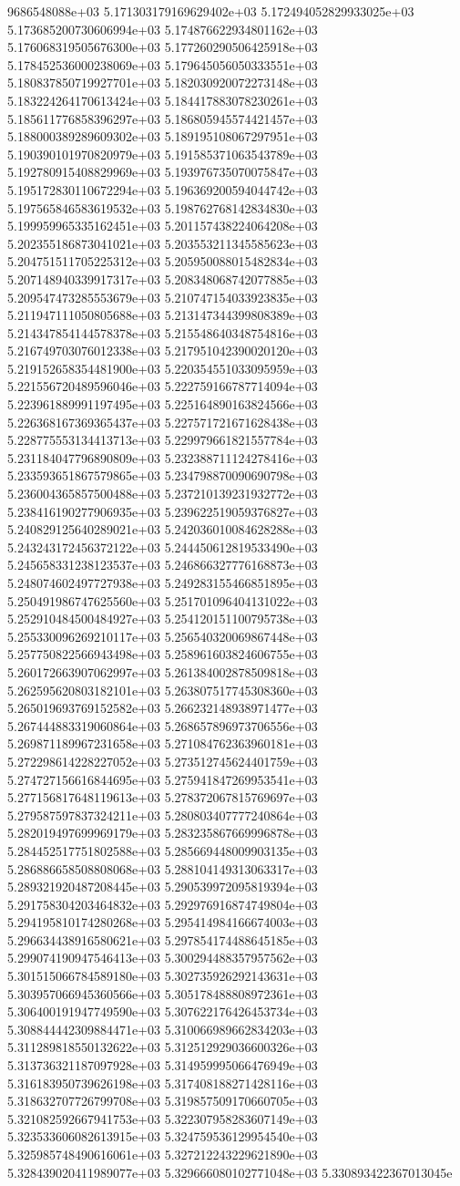 9686548088e+03	5.171303179169629402e+03	5.172494052829933025e+03	5.173685200730606994e+03	5.174876622934801162e+03	5.176068319505676300e+03	5.177260290506425918e+03	5.178452536000238069e+03	5.179645056050333551e+03	5.180837850719927701e+03	5.182030920072273148e+03	5.183224264170613424e+03	5.184417883078230261e+03	5.185611776858396297e+03	5.186805945574421457e+03	5.188000389289609302e+03	5.189195108067297951e+03	5.190390101970820979e+03	5.191585371063543789e+03	5.192780915408829969e+03	5.193976735070075847e+03	5.195172830110672294e+03	5.196369200594044742e+03	5.197565846583619532e+03	5.198762768142834830e+03	5.199959965335162451e+03	5.201157438224064208e+03	5.202355186873041021e+03	5.203553211345585623e+03	5.204751511705225312e+03	5.205950088015482834e+03	5.207148940339917317e+03	5.208348068742077885e+03	5.209547473285553679e+03	5.210747154033923835e+03	5.211947111050805688e+03	5.213147344399808389e+03	5.214347854144578378e+03	5.215548640348754816e+03	5.216749703076012338e+03	5.217951042390020120e+03	5.219152658354481900e+03	5.220354551033095959e+03	5.221556720489596046e+03	5.222759166787714094e+03	5.223961889991197495e+03	5.225164890163824566e+03	5.226368167369365437e+03	5.227571721671628438e+03	5.228775553134413713e+03	5.229979661821557784e+03	5.231184047796890809e+03	5.232388711124278416e+03	5.233593651867579865e+03	5.234798870090690798e+03	5.236004365857500488e+03	5.237210139231932772e+03	5.238416190277906935e+03	5.239622519059376827e+03	5.240829125640289021e+03	5.242036010084628288e+03	5.243243172456372122e+03	5.244450612819533490e+03	5.245658331238123537e+03	5.246866327776168873e+03	5.248074602497727938e+03	5.249283155466851895e+03	5.250491986747625560e+03	5.251701096404131022e+03	5.252910484500484927e+03	5.254120151100795738e+03	5.255330096269210117e+03	5.256540320069867448e+03	5.257750822566943498e+03	5.258961603824606755e+03	5.260172663907062997e+03	5.261384002878509818e+03	5.262595620803182101e+03	5.263807517745308360e+03	5.265019693769152582e+03	5.266232148938971477e+03	5.267444883319060864e+03	5.268657896973706556e+03	5.269871189967231658e+03	5.271084762363960181e+03	5.272298614228227052e+03	5.273512745624401759e+03	5.274727156616844695e+03	5.275941847269953541e+03	5.277156817648119613e+03	5.278372067815769697e+03	5.279587597837324211e+03	5.280803407777240864e+03	5.282019497699969179e+03	5.283235867669996878e+03	5.284452517751802588e+03	5.285669448009903135e+03	5.286886658508808068e+03	5.288104149313063317e+03	5.289321920487208445e+03	5.290539972095819394e+03	5.291758304203464832e+03	5.292976916874749804e+03	5.294195810174280268e+03	5.295414984166674003e+03	5.296634438916580621e+03	5.297854174488645185e+03	5.299074190947546413e+03	5.300294488357957562e+03	5.301515066784589180e+03	5.302735926292143631e+03	5.303957066945360566e+03	5.305178488808972361e+03	5.306400191947749590e+03	5.307622176426453734e+03	5.308844442309884471e+03	5.310066989662834203e+03	5.311289818550132622e+03	5.312512929036600326e+03	5.313736321187097928e+03	5.314959995066476949e+03	5.316183950739626198e+03	5.317408188271428116e+03	5.318632707726799708e+03	5.319857509170660705e+03	5.321082592667941753e+03	5.322307958283607149e+03	5.323533606082613915e+03	5.324759536129954540e+03	5.325985748490616061e+03	5.327212243229621890e+03	5.328439020411989077e+03	5.329666080102771048e+03	5.330893422367013045e